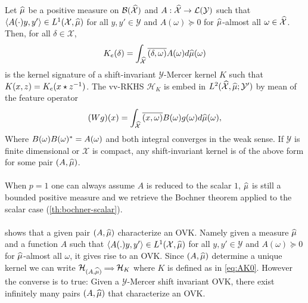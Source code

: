 \begin{proposition}\label{pr:mercer_kernel_bochner}
Let $\widehat{\mu}$ be a positive measure on $\mathcal{B}(\mathcal{\widehat{\mathcal{X}}})$ and $A: \widehat{\mathcal{X}}\to \mathcal{L}(\mathcal{Y})$ such that $\langle A(\cdot)y,y'\rangle\in L^1(\mathcal{X},\widehat{\mu})$ for all $y,y'\in\mathcal{Y}$ and $A(\omega)\succcurlyeq 0$ for $\widehat{\mu}$-almost all $\omega\in\widehat{\mathcal{X}}$. Then, for all $\delta \in \mathcal{X}$,
\begin{dmath}
\label{eq:AK0}
K_e(\delta)=\int_{\dual{\mathcal{X}}}\conj{\pairing{\delta,\omega}}A(\omega)d\dual{\mu}(\omega)
\end{dmath}
is the kernel signature of a shift-invariant $\mathcal{Y}$-Mercer kernel $K$ such that $K(x,z)=K_e(x \star {z}^{-1})$. The \acs{vv-RKHS} $\mathcal{H}_K$ is embed in $L^2(\widehat{\mathcal{X}},\widehat{\mu};\mathcal{Y}')$ by mean of the feature operator
\begin{dmath}
\label{eq:feature_operator}
(Wg)(x)=\int_{\mathcal{\dual{X}}}\conj{\pairing{x,\omega}}B(\omega)g(\omega)d\dual{\mu}(\omega),
\end{dmath}
Where $B(\omega)B(\omega)^*=A(\omega)$ and both integral converges in the weak sense. If $\mathcal{Y}$ is finite dimensional or $\mathcal{X}$ is compact, any shift-invariant kernel is of the above form for some pair $(A, \widehat{\mu})$.
\end{proposition}
\paragraph{}
When $p=1$ one can always assume $A$ is reduced to the scalar $1$, $\widehat{\mu}$ is still a bounded positive measure and we retrieve the Bochner theorem applied to the scalar case (\cref{th:bochner-scalar}).
\paragraph{}
 shows that a given pair $(A,\widehat{\mu})$ characterize an \acs{OVK}. Namely given a measure $\widehat{\mu}$ and a function $A$ such that $\langle A(.)y,y'\rangle\in L^1(\mathcal{X},\widehat{\mu})$ for all $y,y'\in\mathcal{Y}$ and $A(\omega)\succcurlyeq 0$ for $\widehat{\mu}$-almost all $\omega$, it gives rise to an \acs{OVK}. Since $(A,\widehat{\mu})$ determine a unique kernel we can write $\mathcal{H}_{(A,\widehat{\mu})}{\scriptstyle\implies}\mathcal{H}_K$ where $K$ is defined as in \cref{eq:AK0}. However the converse is to true: Given a $\mathcal{Y}$-Mercer shift invariant \acl{OVK}, there exist infinitely many pairs $(A,\widehat{\mu})$ that characterize an \acs{OVK}.

